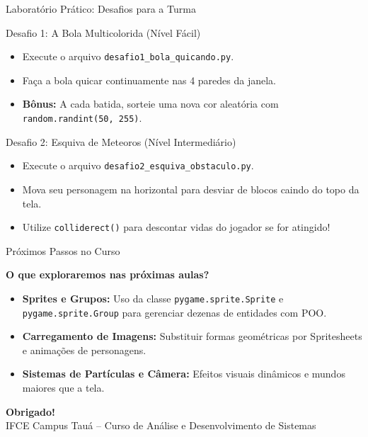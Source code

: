 \begin{frame}{Laboratório Prático: Desafios para a Turma}
    \begin{block}{Desafio 1: A Bola Multicolorida (Nível Fácil)}
        \begin{itemize}
            \item Execute o arquivo \texttt{desafio1\_bola\_quicando.py}.
            \item Faça a bola quicar continuamente nas 4 paredes da janela.
            \item \textbf{Bônus:} A cada batida, sorteie uma nova cor aleatória com \texttt{random.randint(50, 255)}.
        \end{itemize}
    \end{block}

    \vspace{0.2cm}
    \begin{block}{Desafio 2: Esquiva de Meteoros (Nível Intermediário)}
        \begin{itemize}
            \item Execute o arquivo \texttt{desafio2\_esquiva\_obstaculo.py}.
            \item Mova seu personagem na horizontal para desviar de blocos caindo do topo da tela.
            \item Utilize \texttt{colliderect()} para descontar vidas do jogador se for atingido!
        \end{itemize}
    \end{block}
\end{frame}

\begin{frame}{Próximos Passos no Curso}
    \begin{center}
        \Large{\textbf{O que exploraremos nas próximas aulas?}}
    \end{center}

    \vspace{0.3cm}
    \begin{itemize}
        \item \textbf{Sprites e Grupos:} Uso da classe \texttt{pygame.sprite.Sprite} e \texttt{pygame.sprite.Group} para gerenciar dezenas de entidades com POO.
        \item \textbf{Carregamento de Imagens:} Substituir formas geométricas por Spritesheets e animações de personagens.
        \item \textbf{Sistemas de Partículas e Câmera:} Efeitos visuais dinâmicos e mundos maiores que a tela.
    \end{itemize}

    \vspace{0.5cm}
    \begin{center}
        \textbf{Obrigado!} \\
        \footnotesize{IFCE Campus Tauá -- Curso de Análise e Desenvolvimento de Sistemas}
    \end{center}
\end{frame}
